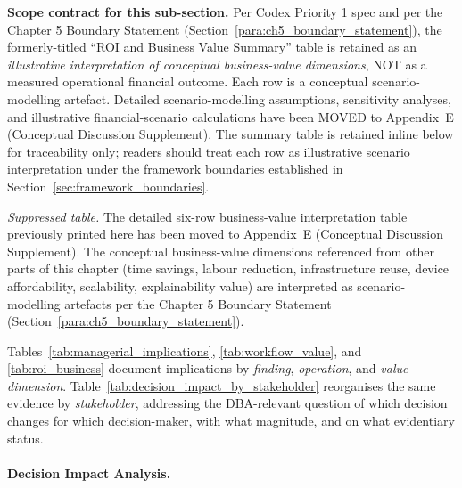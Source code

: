 \noindent\textbf{Scope contract for this sub-section.} Per Codex Priority 1 spec and per the Chapter 5 Boundary Statement (Section~\ref{para:ch5_boundary_statement}), the formerly-titled ``ROI and Business Value Summary'' table is retained as an \emph{illustrative interpretation of conceptual business-value dimensions}, NOT as a measured operational financial outcome. Each row is a conceptual scenario-modelling artefact. Detailed scenario-modelling assumptions, sensitivity analyses, and illustrative financial-scenario calculations have been MOVED to Appendix~E (Conceptual Discussion Supplement). The summary table is retained inline below for traceability only; readers should treat each row as illustrative scenario interpretation under the framework boundaries established in Section~\ref{sec:framework_boundaries}.

\label{tab:roi_business}

\noindent\textit{Suppressed table.} The detailed six-row business-value interpretation table previously printed here has been moved to Appendix~E (Conceptual Discussion Supplement). The conceptual business-value dimensions referenced from other parts of this chapter (time savings, labour reduction, infrastructure reuse, device affordability, scalability, explainability value) are interpreted as scenario-modelling artefacts per the Chapter 5 Boundary Statement (Section~\ref{para:ch5_boundary_statement}).

\noindent Tables~\ref{tab:managerial_implications}, \ref{tab:workflow_value}, and \ref{tab:roi_business} document implications by \emph{finding}, \emph{operation}, and \emph{value dimension}. Table~\ref{tab:decision_impact_by_stakeholder} reorganises the same evidence by \emph{stakeholder}, addressing the DBA-relevant question of which decision changes for which decision-maker, with what magnitude, and on what evidentiary status.

\paragraph{Decision Impact Analysis.}



